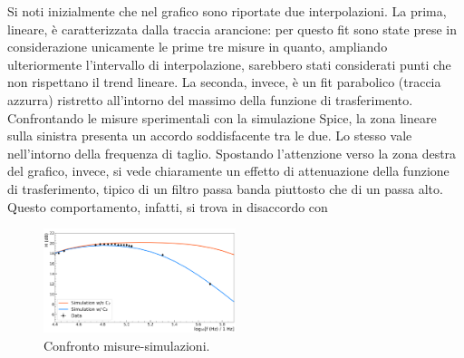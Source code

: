\documentclass[a4paper,11pt]{article} %
\begin{document}
\noindent Si noti inizialmente che nel grafico sono riportate due interpolazioni. La prima, lineare, è
caratterizzata dalla traccia arancione: per questo fit sono state prese in considerazione unicamente le prime tre
misure in quanto, ampliando ulteriormente l'intervallo di interpolazione, sarebbero stati considerati punti che non
rispettano il trend lineare. La seconda, invece, è un fit parabolico (traccia azzurra) ristretto all'intorno del
massimo della funzione di trasferimento. Confrontando le misure sperimentali con la simulazione Spice, la zona
lineare sulla sinistra presenta un accordo soddisfacente tra le due. Lo stesso vale nell'intorno della frequenza di
taglio. Spostando l'attenzione verso la zona destra del grafico, invece, si vede chiaramente un effetto di
attenuazione della funzione di trasferimento, tipico di un filtro passa banda piuttosto che di un passa alto. Questo
comportamento, infatti, si trova in disaccordo con 

	\begin{figure}
		\centering
		\includegraphics[width=0.5\textwidth]{../Plots/Report_Plots/diff_sim_comp.png}
		\caption{\small Confronto misure-simulazioni.}
		\label{i:diff_sim_comp}
	\end{figure}
	
\end{document}

